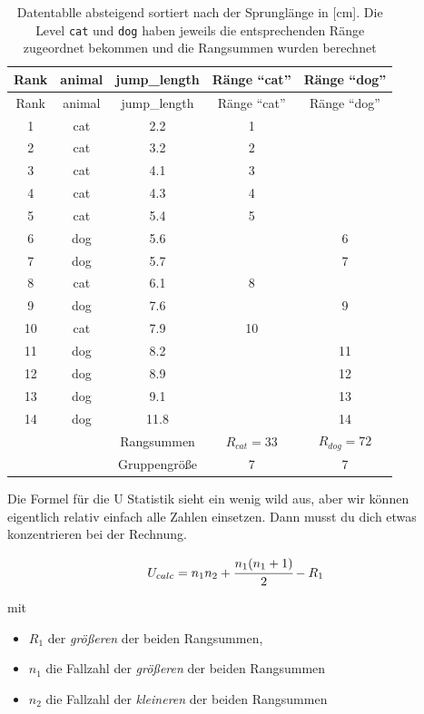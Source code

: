 \documentclass[
  letterpaper,
]{scrbook}
\providecommand{\tightlist}{%
  \setlength{\itemsep}{0pt}\setlength{\parskip}{0pt}}\usepackage{longtable,booktabs,array}
\begin{document}
\hypertarget{tbl-utest-rank}{}
\begin{longtable}[]{@{}ccccc@{}}
\caption{\label{tbl-utest-rank}Datentablle absteigend sortiert nach der
Sprunglänge in {[}cm{]}. Die Level \texttt{cat} und \texttt{dog} haben
jeweils die entsprechenden Ränge zugeordnet bekommen und die Rangsummen
wurden berechnet}\tabularnewline
\toprule()
Rank & animal & jump\_length & Ränge ``cat'' & Ränge ``dog'' \\
\midrule()
\endfirsthead
\toprule()
Rank & animal & jump\_length & Ränge ``cat'' & Ränge ``dog'' \\
\midrule()
\endhead
1 & cat & 2.2 & 1 & \\
2 & cat & 3.2 & 2 & \\
3 & cat & 4.1 & 3 & \\
4 & cat & 4.3 & 4 & \\
5 & cat & 5.4 & 5 & \\
6 & dog & 5.6 & & 6 \\
7 & dog & 5.7 & & 7 \\
8 & cat & 6.1 & 8 & \\
9 & dog & 7.6 & & 9 \\
10 & cat & 7.9 & 10 & \\
11 & dog & 8.2 & & 11 \\
12 & dog & 8.9 & & 12 \\
13 & dog & 9.1 & & 13 \\
14 & dog & 11.8 & & 14 \\
& & Rangsummen & \(R_{cat} = 33\) & \(R_{dog} = 72\) \\
& & Gruppengröße & 7 & 7 \\
\bottomrule()
\end{longtable}

Die Formel für die U Statistik sieht ein wenig wild aus, aber wir können
eigentlich relativ einfach alle Zahlen einsetzen. Dann musst du dich
etwas konzentrieren bei der Rechnung.

\[
U_{calc} = n_1n_2 + \cfrac{n_1(n_1+1)}{2}-R_1
\]

mit

\begin{itemize}
\tightlist
\item
  \(R_1\) der \emph{größeren} der beiden Rangsummen,
\item
  \(n_1\) die Fallzahl der \emph{größeren} der beiden Rangsummen
\item
  \(n_2\) die Fallzahl der \emph{kleineren} der beiden Rangsummen
\end{itemize}
\end{document}
